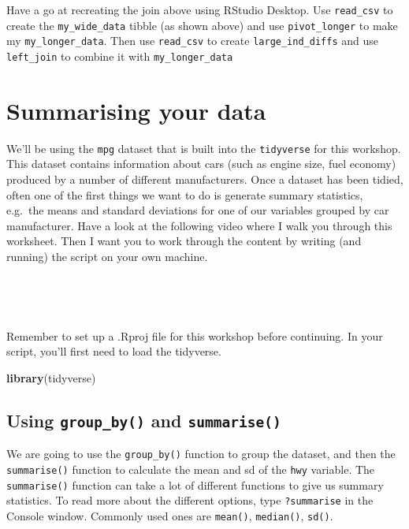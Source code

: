 \documentclass[
]{book}
\newenvironment{Shaded}{\begin{snugshade}}{\end{snugshade}}
\newcommand{\FunctionTok}[1]{\textcolor[rgb]{0.13,0.29,0.53}{\textbf{#1}}}
\newcommand{\NormalTok}[1]{#1}
\begin{document}
Have a go at recreating the join above using RStudio Desktop. Use \texttt{read\_csv} to create the \texttt{my\_wide\_data} tibble (as shown above) and use \texttt{pivot\_longer} to make my \texttt{my\_longer\_data}. Then use \texttt{read\_csv} to create \texttt{large\_ind\_diffs} and use \texttt{left\_join} to combine it with \texttt{my\_longer\_data}

\hypertarget{summarising-your-data}{%
\section{Summarising your data}\label{summarising-your-data}}

We'll be using the \texttt{mpg} dataset that is built into the \texttt{tidyverse} for this workshop. This dataset contains information about cars (such as engine size, fuel economy) produced by a number of different manufacturers. Once a dataset has been tidied, often one of the first things we want to do is generate summary statistics, e.g.~the means and standard deviations for one of our variables grouped by car manufacturer. Have a look at the following video where I walk you through this worksheet. Then I want you to work through the content by writing (and running) the script on your own machine.

~~

~~

Remember to set up a .Rproj file for this workshop before continuing. In your script, you'll first need to load the tidyverse.

\begin{Shaded}
\begin{Highlighting}[]
\FunctionTok{library}\NormalTok{(tidyverse)}
\end{Highlighting}
\end{Shaded}

\hypertarget{using-group_by-and-summarise}{%
\subsection{\texorpdfstring{Using \texttt{group\_by()} and \texttt{summarise()}}{Using group\_by() and summarise()}}\label{using-group_by-and-summarise}}

We are going to use the \texttt{group\_by()} function to group the dataset, and then the \texttt{summarise()} function to calculate the mean and sd of the \texttt{hwy} variable. The \texttt{summarise()} function can take a lot of different functions to give us summary statistics. To read more about the different options, type \texttt{?summarise} in the Console window. Commonly used ones are \texttt{mean()}, \texttt{median()}, \texttt{sd()}.
\end{document}

